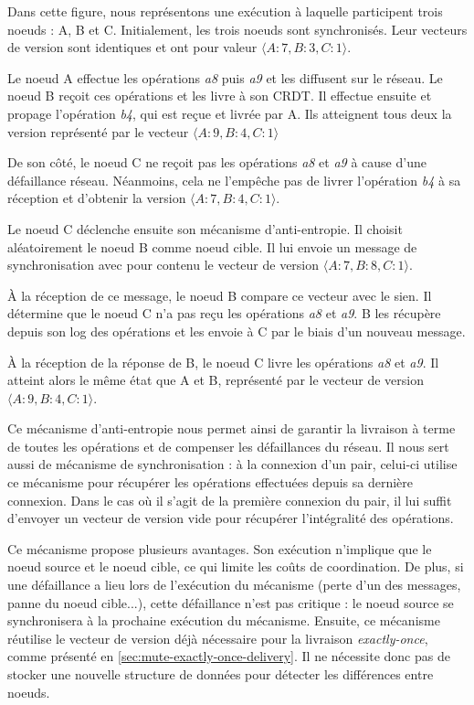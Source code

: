 Dans cette figure, nous représentons une exécution à laquelle participent trois noeuds : A, B et C.
Initialement, les trois noeuds sont synchronisés.
Leur vecteurs de version sont identiques et ont pour valeur $\langle A:7,B:3,C:1 \rangle$.

Le noeud A effectue les opérations \emph{a8} puis \emph{a9} et les diffusent sur le réseau.
Le noeud B reçoit ces opérations et les livre à son \ac{CRDT}.
Il effectue ensuite et propage l'opération \emph{b4}, qui est reçue et livrée par A.
Ils atteignent tous deux la version représenté par le vecteur $\langle A:9,B:4,C:1 \rangle$

De son côté, le noeud C ne reçoit pas les opérations \emph{a8} et \emph{a9} à cause d'une défaillance réseau.
Néanmoins, cela ne l'empêche pas de livrer l'opération \emph{b4} à sa réception et d'obtenir la version $\langle A:7,B:4,C:1 \rangle$.

Le noeud C déclenche ensuite son mécanisme d'anti-entropie.
Il choisit aléatoirement le noeud B comme noeud cible.
Il lui envoie un message de synchronisation avec pour contenu le vecteur de version $\langle A:7,B:8,C:1 \rangle$.

À la réception de ce message, le noeud B compare ce vecteur avec le sien.
Il détermine que le noeud C n'a pas reçu les opérations \emph{a8} et \emph{a9}.
B les récupère depuis son log des opérations et les envoie à C par le biais d'un nouveau message.

À la réception de la réponse de B, le noeud C livre les opérations \emph{a8} et \emph{a9}.
Il atteint alors le même état que A et B, représenté par le vecteur de version $\langle A:9,B:4,C:1 \rangle$.

Ce mécanisme d'anti-entropie nous permet ainsi de garantir la livraison à terme de toutes les opérations et de compenser les défaillances du réseau.
Il nous sert aussi de mécanisme de synchronisation : à la connexion d'un pair, celui-ci utilise ce mécanisme pour récupérer les opérations effectuées depuis sa dernière connexion.
Dans le cas où il s'agit de la première connexion du pair, il lui suffit d'envoyer un vecteur de version vide pour récupérer l'intégralité des opérations.

Ce mécanisme propose plusieurs avantages.
Son exécution n'implique que le noeud source et le noeud cible, ce qui limite les coûts de coordination.
De plus, si une défaillance a lieu lors de l'exécution du mécanisme (perte d'un des messages, panne du noeud cible...), cette défaillance n'est pas critique : le noeud source se synchronisera à la prochaine exécution du mécanisme.
Ensuite, ce mécanisme réutilise le vecteur de version déjà nécessaire pour la livraison \emph{exactly-once}, comme présenté en \autoref{sec:mute-exactly-once-delivery}.
Il ne nécessite donc pas de stocker une nouvelle structure de données pour détecter les différences entre noeuds.

